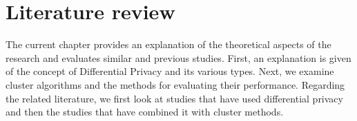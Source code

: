 \chapter{Literature review}
The current chapter provides an explanation of the theoretical aspects of the research and evaluates similar and previous studies.
First, an explanation is given of the concept of Differential Privacy and its various types.
Next, we examine cluster algorithms and the methods for evaluating their performance.
Regarding the related literature, we first look at studies that have used differential privacy and then the studies that have combined it with cluster methods.




